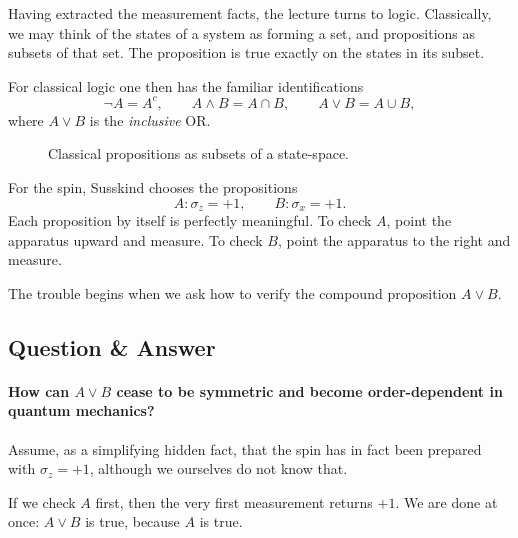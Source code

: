 Having extracted the measurement facts, the lecture turns to logic. Classically, we may think of the states of a system as forming a set, and propositions as subsets of that set. The proposition is true exactly on the states in its subset.

For classical logic one then has the familiar identifications
\begin{equation}
\neg A=A^c,\qquad A\land B=A\cap B,\qquad A\lor B=A\cup B,
\end{equation}
where \(A\lor B\) is the \emph{inclusive} OR.

\begin{figure}
\centering
{}
\caption{Classical propositions as subsets of a state-space.}
\end{figure}

For the spin, Susskind chooses the propositions
\begin{equation}
A:\sigma_z=+1,\qquad B:\sigma_x=+1.
\end{equation}
Each proposition by itself is perfectly meaningful. To check \(A\), point the apparatus upward and measure. To check \(B\), point the apparatus to the right and measure.

The trouble begins when we ask how to verify the compound proposition \(A\lor B\).

\subsection{Question \& Answer}

\paragraph{How can \(A\lor B\) cease to be symmetric and become order-dependent in quantum mechanics?}

Assume, as a simplifying hidden fact, that the spin has in fact been prepared with \(\sigma_z=+1\), although we ourselves do not know that.

If we check \(A\) first, then the very first measurement returns \(+1\). We are done at once: \(A\lor B\) is true, because \(A\) is true.

